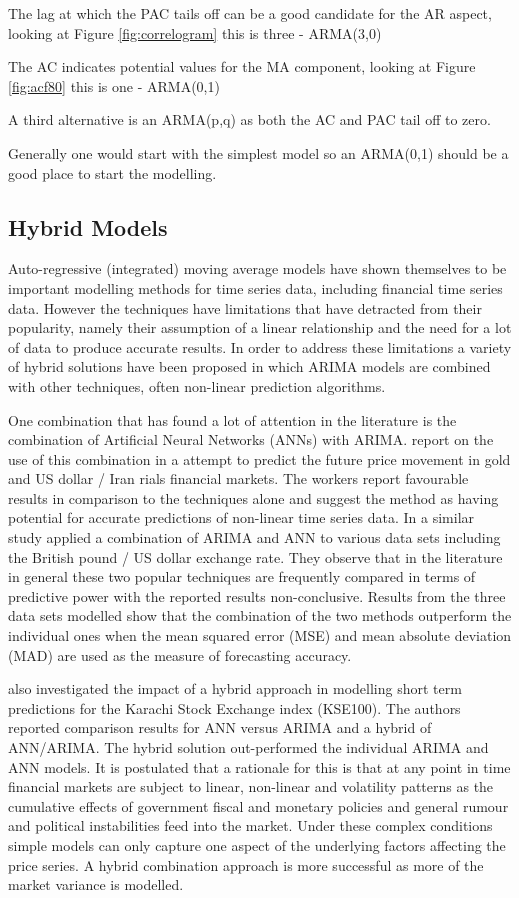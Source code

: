 \label{todo3}
The lag at which the PAC tails off can be a good candidate for the AR aspect, looking at Figure \ref{fig:correlogram} this is three - ARMA(3,0)

The AC indicates potential values for the MA component, looking at Figure \ref{fig:acf80} this is one - ARMA(0,1)

A third alternative is an ARMA(p,q) as both the AC and PAC tail off to zero.

Generally one would start with the simplest model so an ARMA(0,1) should be a good place to start the modelling.

\subsection{Hybrid Models}
Auto-regressive (integrated) moving average models have shown themselves to be important modelling methods for time series data, including financial time series data. However the techniques have limitations that have detracted from their popularity, namely their assumption of a linear relationship and the need for a lot of data to produce accurate results. In order to address these limitations a variety of hybrid solutions have been proposed in which ARIMA models are combined with other techniques, often non-linear prediction algorithms.

One combination that has found a lot of attention in the literature is the combination of Artificial Neural Networks (ANNs) with ARIMA. \cite{Khashei2009956} report on the use of this combination in a attempt to predict the future price movement in gold and US dollar / Iran rials financial markets. The workers report favourable results in comparison to the techniques alone and suggest the method as having potential for accurate predictions of non-linear time series data. In a similar study \cite{Zhang2003159} applied a combination of ARIMA and ANN to various data sets including the British pound / US dollar exchange rate. They observe that in the literature in general these two popular techniques are frequently compared in terms of predictive power with the reported results non-conclusive. Results from the three data sets modelled show that the combination of the two methods outperform the individual ones when the mean squared error (MSE) and mean
absolute deviation (MAD) are used as the measure of forecasting accuracy.

\cite{Fatima20082742} also investigated the impact of a hybrid approach in modelling short term predictions for the Karachi Stock Exchange index (KSE100). The authors reported comparison results for ANN versus ARIMA and a hybrid of ANN/ARIMA. The hybrid solution out-performed the individual ARIMA and ANN models. It is postulated that a rationale for this is that at any point in time financial markets are subject to linear, non-linear and volatility patterns as the cumulative effects of government fiscal and monetary policies and general rumour and political instabilities feed into the market. Under these complex conditions simple models can only capture one aspect of the underlying factors affecting the price series. A hybrid combination approach is more successful as more of the market variance is modelled.

